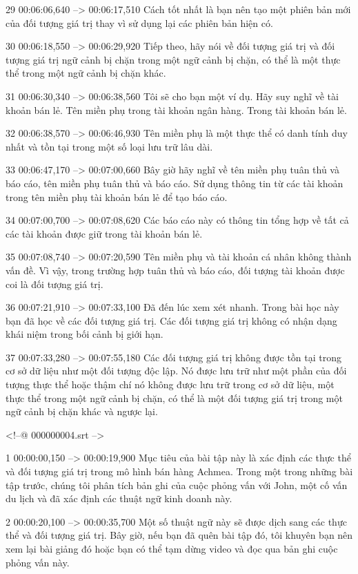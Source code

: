 29
00:06:06,640 --> 00:06:17,510
Cách tốt nhất là bạn nên tạo một phiên bản mới của đối tượng giá trị thay vì sử dụng lại các phiên bản hiện có.

30
00:06:18,550 --> 00:06:29,920
Tiếp theo, hãy nói về đối tượng giá trị và đối tượng giá trị ngữ cảnh bị chặn trong một ngữ cảnh bị chặn, có thể là một thực thể trong một ngữ cảnh bị chặn khác.

31
00:06:30,340 --> 00:06:38,560
Tôi sẽ cho bạn một ví dụ.  Hãy suy nghĩ về tài khoản bán lẻ.  Tên miền phụ trong tài khoản ngân hàng.  Trong tài khoản bán lẻ.

32
00:06:38,570 --> 00:06:46,930
Tên miền phụ là một thực thể có danh tính duy nhất và tồn tại trong một số loại lưu trữ lâu dài.

33
00:06:47,170 --> 00:07:00,660
Bây giờ hãy nghĩ về tên miền phụ tuân thủ và báo cáo, tên miền phụ tuân thủ và báo cáo.  Sử dụng thông tin từ các tài khoản trong tên miền phụ tài khoản bán lẻ để tạo báo cáo.

34
00:07:00,700 --> 00:07:08,620
Các báo cáo này có thông tin tổng hợp về tất cả các tài khoản được giữ trong tài khoản bán lẻ.

35
00:07:08,740 --> 00:07:20,590
Tên miền phụ và tài khoản cá nhân không thành vấn đề.  Vì vậy, trong trường hợp tuân thủ và báo cáo, đối tượng tài khoản được coi là đối tượng giá trị.

36
00:07:21,910 --> 00:07:33,100
Đã đến lúc xem xét nhanh.  Trong bài học này bạn đã học về các đối tượng giá trị.  Các đối tượng giá trị không có nhận dạng khái niệm trong bối cảnh bị giới hạn.

37
00:07:33,280 --> 00:07:55,180
Các đối tượng giá trị không được tồn tại trong cơ sở dữ liệu như một đối tượng độc lập.  Nó được lưu trữ như một phần của đối tượng thực thể hoặc thậm chí nó không được lưu trữ trong cơ sở dữ liệu, một thực thể trong một ngữ cảnh bị chặn, có thể là một đối tượng giá trị trong một ngữ cảnh bị chặn khác và ngược lại.

<!--@ 000000004.srt -->

1
00:00:00,150 --> 00:00:19,900
Mục tiêu của bài tập này là xác định các thực thể và đối tượng giá trị trong mô hình bán hàng Achmea.  Trong một trong những bài tập trước, chúng tôi phân tích bản ghi của cuộc phỏng vấn với John, một cố vấn du lịch và đã xác định các thuật ngữ kinh doanh này.

2
00:00:20,100 --> 00:00:35,700
Một số thuật ngữ này sẽ được dịch sang các thực thể và đối tượng giá trị.  Bây giờ, nếu bạn đã quên bài tập đó, tôi khuyên bạn nên xem lại bài giảng đó hoặc bạn có thể tạm dừng video và đọc qua bản ghi cuộc phỏng vấn này.

